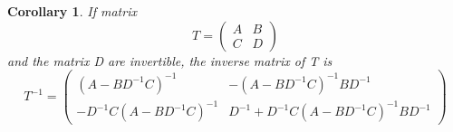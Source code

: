 \documentclass{article}
\newtheorem{corollary}{Corollary}
\begin{document}
    \begin{corollary}
         If matrix
        $$
            T =
            \begin{pmatrix}
                A & B \\
                C & D
            \end{pmatrix}
        $$
        and the matrix D are invertible, the inverse matrix of T is
        $$
            T^{-1} =
            \begin{pmatrix}
                (A - B D^{-1} C)^{-1} & -(A - B D^{-1} C)^{-1} B D^{-1} \\
                -D^{-1} C (A - B D^{-1} C)^{-1} & D^{-1} + D^{-1} C (A - B D^{-1} C)^{-1} B D^{-1}
            \end{pmatrix}
        $$
    \end{corollary}
\end{document}

